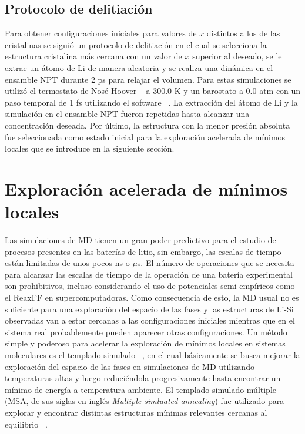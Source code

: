 \subsection{Protocolo de delitiación}

Para obtener configuraciones iniciales para valores de $x$ distintos a los de las 
cristalinas se siguió un protocolo de delitiación en el cual se selecciona la 
estructura cristalina más cercana con un valor de $x$ superior al deseado,
se le extrae un átomo de Li de manera aleatoria y se realiza una dinámica en el 
ensamble NPT durante 2 ps para relajar el volumen. Para estas simulaciones se 
utilizó el termostato de Nosé-Hoover ~\cite{nose1984a, nose1984b, hoover1985} a
300.0 K y un barostato a 0.0 atm con un paso temporal de 1 fs utilizando el
software  ~\cite{lammps1, lammps2}. La extracción del átomo de Li y
la simulación en el ensamble NPT fueron repetidas hasta alcanzar una concentración
deseada. Por último, la estructura con la menor presión absoluta fue seleccionada
como estado inicial para la exploración acelerada de mínimos locales que se 
introduce en la siguiente sección.


\section{Exploración acelerada de mínimos locales}

Las simulaciones de MD tienen un gran poder predictivo para el estudio de 
procesos presentes en las baterías de litio, sin embargo, las escalas de tiempo
están limitadas de unos pocos ns o $\mu$s. El número de operaciones que se 
necesita para alcanzar las escalas de tiempo de la operación de una batería 
experimental son prohibitivos, incluso considerando el uso de potenciales 
semi-empíricos como el ReaxFF en supercomputadoras. Como consecuencia de esto,
la MD usual no es suficiente para una exploración del espacio de las fases y las
estructuras de Li-Si observadas van a estar cercanas a las configuraciones 
iniciales mientras que en el sistema real probablemente pueden aparecer otras
configuraciones. Un método simple y poderoso para acelerar la exploración de 
mínimos locales en sistemas moleculares es el templado simulado 
~\cite{kirkpatrick1983}, en el cual básicamente se busca mejorar la exploración
del espacio de las fases en simulaciones de MD utilizando temperaturas altas y
luego reduciéndola progresivamente hasta encontrar un mínimo de energía a 
temperatura ambiente. El templado simulado múltiple (MSA, de sus siglas en inglés 
\textit{Multiple simluated annealing}) fue utilizado para explorar y encontrar
distintas estructuras mínimas relevantes cercanas al equilibrio ~\cite{hao2015}.

